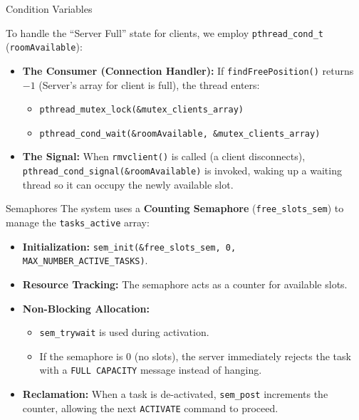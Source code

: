 \begin{frame}{Condition Variables}

    To handle the ``Server Full'' state for clients, we employ
    \texttt{pthread\_cond\_t} (\texttt{roomAvailable}):

    \begin{itemize}


        \item \textbf{The Consumer (Connection Handler):}
        If \texttt{findFreePosition()} returns $-1$ (Server's array for client is full), the
        thread enters:

        \begin{itemize}
            \item \texttt{pthread\_mutex\_lock(\&mutex\_clients\_array)}
            \item \texttt{pthread\_cond\_wait(\&roomAvailable,
            \&mutex\_clients\_array)}
        \end{itemize}

        \item \textbf{The Signal:}
        When \texttt{rmvclient()} is called (a client disconnects),
        \texttt{pthread\_cond\_signal(\&roomAvailable)} is invoked,
        waking up a waiting thread so it can occupy the newly available
        slot.

    \end{itemize}

\end{frame}


\begin{frame}{Semaphores}
    The system uses a \textbf{Counting Semaphore} (\texttt{free\_slots\_sem}) to manage the \texttt{tasks\_active} array:
    \begin{itemize}
        \item \textbf{Initialization:} \texttt{sem\_init(\&free\_slots\_sem, 0, MAX\_NUMBER\_ACTIVE\_TASKS)}.
        \item \textbf{Resource Tracking:} The semaphore acts as a counter for available slots.
        \item \textbf{Non-Blocking Allocation:} 
        \begin{itemize}
            \item \texttt{sem\_trywait} is used during activation. 
            \item If the semaphore is 0 (no slots), the server immediately rejects the task with a \texttt{FULL CAPACITY} message instead of hanging.
        \end{itemize}
        \item \textbf{Reclamation:} When a task is de-activated, \texttt{sem\_post} increments the counter, allowing the next \texttt{ACTIVATE} command to proceed.
    \end{itemize}
\end{frame}


